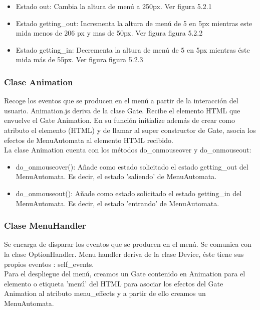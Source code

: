 \begin{itemize}
 \item Estado out: Cambia la altura de menú a 250px. Ver figura 5.2.1

 \item Estado getting\_out: Incrementa la altura de menú de 5 en 5px  mientras este mida menos de 206 px y mas de 50px. Ver figura figura 5.2.2

 \item Estado getting\_in: Decrementa la altura de menú de 5 en 5px  mientras éste mida  más de 55px. Ver figura figura 5.2.3
\end{itemize}


\subsubsection{Clase Animation}
\label{subsubsection:animation}

Recoge los eventos que se producen en el menú a partir de la interacción del usuario. Animation.js deriva de la clase Gate.
Recibe el elemento HTML que envuelve  el Gate Animation. En su función initialize además de crear como atributo  el elemento (HTML) y de llamar
al super constructor de Gate, asocia los efectos de MenuAutomata al elemento HTML recibido.\\

La clase Animation cuenta con los métodos do\_onmouseover y do\_onmouseout:
\begin{itemize}
 \item do\_onmouseover(): Añade como estado solicitado el estado getting\_out del MenuAutomata.
Es decir, el estado 'saliendo' de MenuAutomata.

 \item do\_onmouseout(): Añade como estado solicitado el estado getting\_in del MenuAutomata.
Es decir, el estado 'entrando' de MenuAutomata.
\end{itemize}

\subsubsection{Clase MenuHandler}
\label{subsubsection:menu_handler}

Se encarga de disparar los eventos que se producen en el menú. Se comunica con la clase OptionHandler.
Menu handler deriva de la clase Device, éste  tiene sus propios eventos : self\_events.\\

Para el despliegue del menú, creamos un Gate contenido en Animation para el elemento o etiqueta 'menú' del HTML para asociar los efectos del 
Gate Animation al atributo menu\_effects y a partir de ello creamos un MenuAutomata.\\

